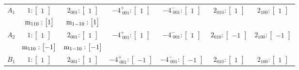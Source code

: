 \documentclass[fleqn,8pt,landscape]{jsarticle}
\begin{document}
\begin{longtable}{ccccccc}
$ A_{1} $ & $ 1:\begin{bmatrix} 1 \end{bmatrix} $ & $ 2{}_{001}:\begin{bmatrix} 1 \end{bmatrix} $ & $ -4^{+}_{\,\,001}:\begin{bmatrix} 1 \end{bmatrix} $ & $ -4^{-}_{\,\,001}:\begin{bmatrix} 1 \end{bmatrix} $ & $ 2{}_{010}:\begin{bmatrix} 1 \end{bmatrix} $ & $ 2{}_{100}:\begin{bmatrix} 1 \end{bmatrix} $ \\
& $ {\rm m}_{110}:\begin{bmatrix} 1 \end{bmatrix} $ & $ {\rm m}_{1-10}:\begin{bmatrix} 1 \end{bmatrix} $ & $  $ & $  $ & $  $ & $  $ \\ \hline
$ A_{2} $ & $ 1:\begin{bmatrix} 1 \end{bmatrix} $ & $ 2{}_{001}:\begin{bmatrix} 1 \end{bmatrix} $ & $ -4^{+}_{\,\,001}:\begin{bmatrix} 1 \end{bmatrix} $ & $ -4^{-}_{\,\,001}:\begin{bmatrix} 1 \end{bmatrix} $ & $ 2{}_{010}:\begin{bmatrix} -1 \end{bmatrix} $ & $ 2{}_{100}:\begin{bmatrix} -1 \end{bmatrix} $ \\
& $ {\rm m}_{110}:\begin{bmatrix} -1 \end{bmatrix} $ & $ {\rm m}_{1-10}:\begin{bmatrix} -1 \end{bmatrix} $ & $  $ & $  $ & $  $ & $  $ \\ \hline
$ B_{1} $ & $ 1:\begin{bmatrix} 1 \end{bmatrix} $ & $ 2{}_{001}:\begin{bmatrix} 1 \end{bmatrix} $ & $ -4^{+}_{\,\,001}:\begin{bmatrix} -1 \end{bmatrix} $ & $ -4^{-}_{\,\,001}:\begin{bmatrix} -1 \end{bmatrix} $ & $ 2{}_{010}:\begin{bmatrix} 1 \end{bmatrix} $ & $ 2{}_{100}:\begin{bmatrix} 1 \end{bmatrix} $ \\

\end{longtable}
\end{document}
